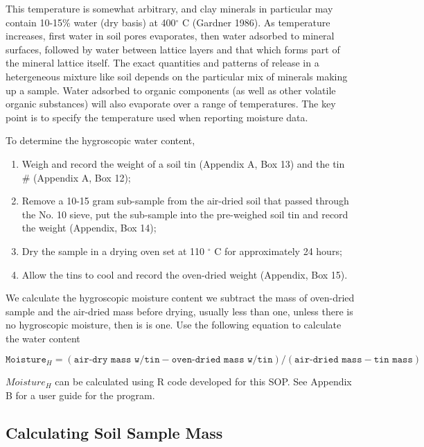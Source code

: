 \documentclass{tufte-handout}
\begin{document}
This temperature is somewhat arbitrary, and clay minerals in particular may contain 10-15\% water (dry basis) at 400$^\circ$ C (Gardner 1986).  As temperature increases, first water in soil pores evaporates, then water adsorbed to mineral surfaces, followed by water between lattice layers and that which forms part of the mineral lattice itself.  The exact quantities and patterns of release in a hetergeneous mixture like soil depends on the particular mix of minerals making up a sample.  Water adsorbed to organic components (as well as other volatile organic substances) will also evaporate over a range of temperatures.  The key point is to specify the temperature used when reporting moisture data.

To determine the hygroscopic water content,

\begin{enumerate}
	\item Weigh and record the weight of a soil tin (Appendix A, Box 13) and the tin \# (Appendix A, Box 12);
	\item Remove a 10-15 gram sub-sample from the air-dried soil that passed through the No. 10 sieve, put the sub-sample into the pre-weighed soil tin and record the weight (Appendix, Box 14);
	\item Dry the sample in a drying oven set at 110 $^\circ$ C for approximately 24 hours;
	\item Allow the tins to cool and record the oven-dried weight (Appendix, Box 15). 
\end{enumerate}

We calculate the  hygroscopic moisture content we subtract the mass of oven-dried sample and the air-dried mass before drying, usually less than one, unless there is no hygroscopic moisture, then is is one. Use the following equation to calculate the water content

\begin{equation}
\texttt{Moisture}_H = (\texttt{air-dry mass w/tin} - \texttt{oven-dried mass w/tin})/(\texttt{air-dried mass} - \texttt{tin mass})
\end{equation}

$Moisture_H$ can be calculated using R code developed for this SOP. See Appendix B for a user guide for the program. 

\subsection{Calculating Soil Sample Mass}
\end{document}
